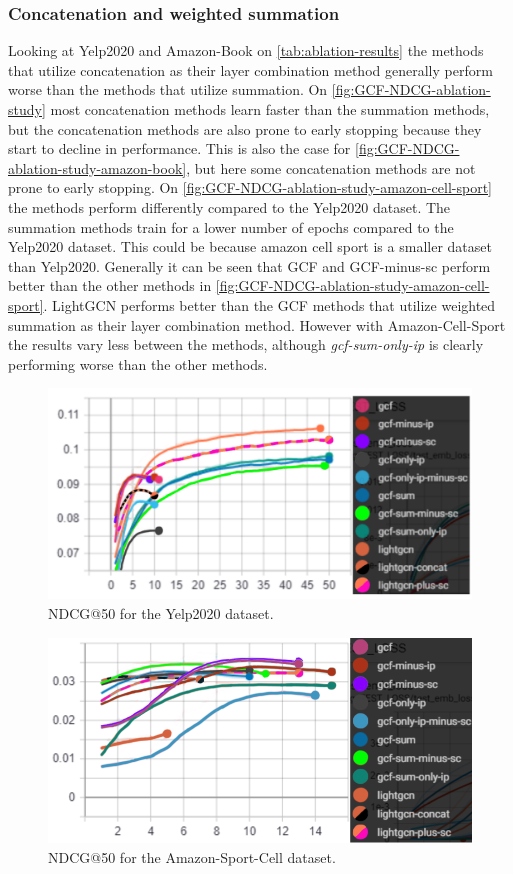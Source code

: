 \subsubsection{Concatenation and weighted summation}
Looking at Yelp2020 and Amazon-Book on \autoref{tab:ablation-results} the methods that utilize concatenation as their layer combination method generally perform worse than the methods that utilize summation.
On \autoref{fig:GCF-NDCG-ablation-study} most concatenation methods learn faster than the summation methods, but the concatenation methods are also prone to early stopping because they start to decline in performance.
This is also the case for \autoref{fig:GCF-NDCG-ablation-study-amazon-book}, but here some concatenation methods are not prone to early stopping.
On \autoref{fig:GCF-NDCG-ablation-study-amazon-cell-sport} the methods perform differently compared to the Yelp2020 dataset.
The summation methods train for a lower number of epochs compared to the Yelp2020 dataset.
This could be because amazon cell sport is a smaller dataset than Yelp2020.
Generally it can be seen that GCF and GCF-minus-sc perform better than the other methods in \autoref{fig:GCF-NDCG-ablation-study-amazon-cell-sport}.
LightGCN performs better than the GCF methods that utilize weighted summation as their layer combination method.
However with Amazon-Cell-Sport the results vary less between the methods, although \textit{gcf-sum-only-ip} is clearly performing worse than the other methods.
\begin{figure}[]
    \includegraphics[width=\linewidth]{figures/gcf-all-ndcg.png}
    \caption{NDCG@50 for the Yelp2020 dataset.}
    \label{fig:GCF-NDCG-ablation-study}
\end{figure}
\begin{figure}[]
    \includegraphics[width=\linewidth]{figures/amazon-cell-sport-gcf-all-ndcg.png}
    \caption{NDCG@50 for the Amazon-Sport-Cell dataset.}
    \label{fig:GCF-NDCG-ablation-study-amazon-cell-sport}
\end{figure}
